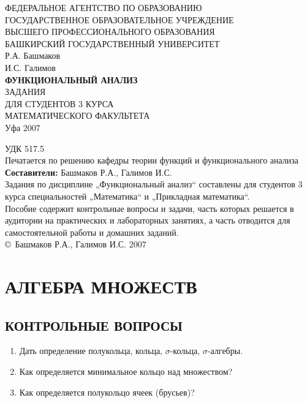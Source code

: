 \documentclass[12pt,a4paper]{article}
\begin{document}
\begin{titlepage}
  \centering
  ФЕДЕРАЛЬНОЕ АГЕНТСТВО ПО ОБРАЗОВАНИЮ\\[0.5cm]
  ГОСУДАРСТВЕННОЕ ОБРАЗОВАТЕЛЬНОЕ УЧРЕЖДЕНИЕ\\
  ВЫСШЕГО ПРОФЕССИОНАЛЬНОГО ОБРАЗОВАНИЯ\\
  БАШКИРСКИЙ ГОСУДАРСТВЕННЫЙ УНИВЕРСИТЕТ\\[3cm]

  Р.А. Башмаков\\
  И.С. Галимов\\[2cm]

  {\Large \bfseries ФУНКЦИОНАЛЬНЫЙ АНАЛИЗ}\\[1.5cm]

  {\large ЗАДАНИЯ\\
    ДЛЯ СТУДЕНТОВ 3 КУРСА\\
  МАТЕМАТИЧЕСКОГО ФАКУЛЬТЕТА}\\[4cm]

  \vfill
  Уфа 2007
\end{titlepage}

\newpage
\noindent УДК 517.5\\[0.5cm]
Печатается по решению кафедры теории функций и функционального анализа\\[0.5cm]
\textbf{Составители:} Башмаков Р.А., Галимов И.С.\\[0.5cm]
Задания по дисциплине „Функциональный анализ“ составлены для студентов 3 курса специальностей „Математика“ и „Прикладная математика“.\\[0.5cm]
Пособие содержит контрольные вопросы и задачи, часть которых решается в аудитории на практических и лабораторных занятиях, а часть отводится для самостоятельной работы и домашних заданий.\\[1cm]
\vfill
\noindent \copyright \ Башмаков Р.А., Галимов И.С. 2007

\newpage
\tableofcontents
\newpage

\section{АЛГЕБРА МНОЖЕСТВ}

\subsection*{КОНТРОЛЬНЫЕ ВОПРОСЫ}
\begin{enumerate}
  \item Дать определение полукольца, кольца, $\sigma$-кольца, $\sigma$-алгебры.
  \item Как определяется минимальное кольцо над множеством?
  \item Как определяется полукольцо ячеек (брусьев)?
\end{enumerate}
\end{document}
